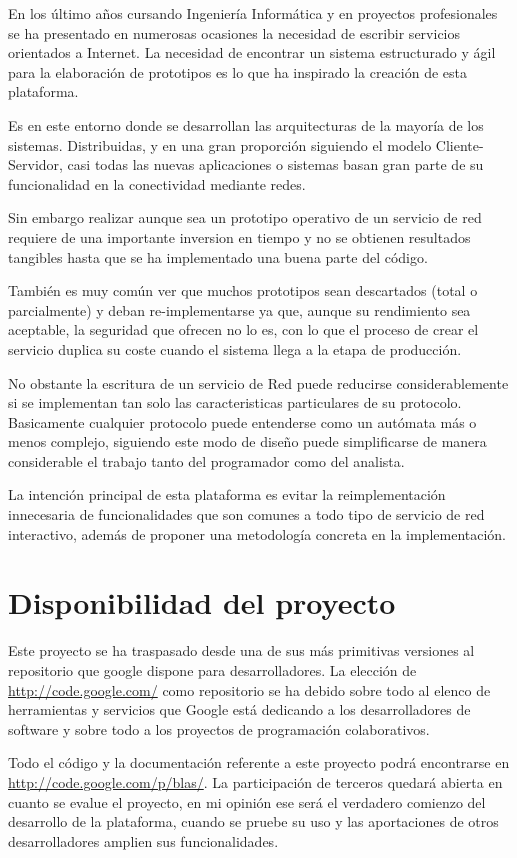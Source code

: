 \documentclass[a4paper,spanish,12pt]{book}
\begin{document}
En los último años cursando Ingeniería Informática y en proyectos profesionales se ha presentado en numerosas ocasiones la necesidad de escribir servicios orientados a Internet. La necesidad de encontrar un sistema estructurado y ágil para la elaboración de prototipos es lo que ha inspirado la creación de esta plataforma.

Es en este entorno donde se desarrollan las arquitecturas de la mayor\'ia de los sistemas. Distribuidas, y en una gran proporci\'on siguiendo el modelo Cliente-Servidor, casi todas las nuevas aplicaciones o sistemas basan gran parte de su funcionalidad en la conectividad mediante redes. 

Sin embargo realizar aunque sea un prototipo operativo de un servicio de red requiere de una importante inversion en tiempo y no se obtienen resultados tangibles hasta que se ha implementado una buena parte del código.

Tambi\'en es muy com\'un ver que muchos prototipos sean descartados (total o parcialmente) y deban re-implementarse ya que, aunque su rendimiento sea aceptable, la seguridad que ofrecen no lo es, con lo que el proceso de crear el servicio duplica su coste cuando el sistema llega a la etapa de producci\'on.

No obstante la escritura de un servicio de Red puede reducirse considerablemente si se implementan tan solo las caracteristicas particulares de su protocolo. Basicamente cualquier protocolo puede entenderse como un autómata m\'as o menos complejo, siguiendo este modo de diseño puede simplificarse de manera considerable el trabajo tanto del programador como del analista.

La intención principal de esta plataforma es evitar la reimplementación innecesaria de funcionalidades que son comunes a todo tipo de servicio de red interactivo, además de proponer una metodología concreta en la implementación.
\section{Disponibilidad del proyecto}
Este proyecto se ha traspasado desde una de sus más primitivas versiones al repositorio que google dispone para desarrolladores. La elección de \url{http://code.google.com/} como repositorio se ha debido sobre todo al elenco de herramientas y servicios que Google está dedicando a los desarrolladores de software y sobre todo a los proyectos de programación colaborativos.

Todo el código y la documentación referente a este proyecto podrá encontrarse en \url{http://code.google.com/p/blas/}. La participación de terceros quedará abierta en cuanto se evalue el proyecto, en mi opinión ese será el verdadero comienzo del desarrollo de la plataforma, cuando se pruebe su uso y las aportaciones de otros desarrolladores amplien sus funcionalidades.
\end{document}
